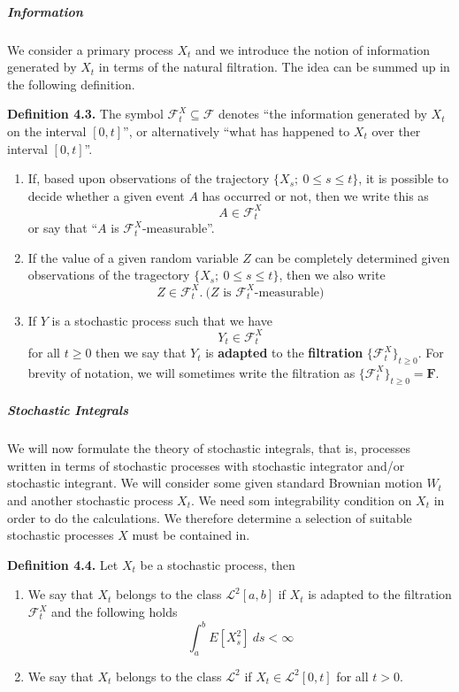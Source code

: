 \documentclass[
]{article}
\providecommand{\tightlist}{%
  \setlength{\itemsep}{0pt}\setlength{\parskip}{0pt}}
\begin{document}
\hypertarget{information}{%
\subparagraph{Information}\label{information}}

We consider a primary process \(X_t\) and we introduce the notion of
information generated by \(X_t\) in terms of the natural filtration. The
idea can be summed up in the following definition.

\textbf{Definition 4.3.} The symbol
\(\mathcal{F}^X_t\subseteq\mathcal{F}\) denotes ``the information
generated by \(X_t\) on the interval \([0,t]\)'', or alternatively
``what has happened to \(X_t\) over ther interval \([0,t]\)''.

\begin{enumerate}
\def\labelenumi{\arabic{enumi}.}
\tightlist
\item
  If, based upon observations of the trajectory
  \(\{X_s;\ 0\le s\le t\}\), it is possible to decide whether a given
  event \(A\) has occurred or not, then we write this as \[
    A\in\mathcal{F}^X_t
    \] or say that ``\(A\) is \(\mathcal{F}^X_t\)-measurable''.
\item
  If the value of a given random variable \(Z\) can be completely
  determined given observations of the tragectory
  \(\{X_s;\ 0\le s\le t\}\), then we also write \[
    Z\in\mathcal{F}^X_t.\ \text{(}Z\text{ is }\mathcal{F}^X_t\text{-measurable)}
    \]
\item
  If \(Y\) is a stochastic process such that we have \[
    Y_t\in\mathcal{F}^X_t
    \] for all \(t\ge0\) then we say that \(Y_t\) is \textbf{adapted} to
  the \textbf{filtration} \(\{\mathcal{F}^X_t\}_{t\ge 0}\). For brevity
  of notation, we will sometimes write the filtration as
  \(\{\mathcal{F}^X_t\}_{t\ge 0}=\mathbf{F}\).
\end{enumerate}

\hypertarget{stochastic-integrals-1}{%
\subparagraph{Stochastic Integrals}\label{stochastic-integrals-1}}

We will now formulate the theory of stochastic integrals, that is,
processes written in terms of stochastic processes with stochastic
integrator and/or stochastic integrant. We will consider some given
standard Brownian motion \(W_t\) and another stochastic process \(X_t\).
We need som integrability condition on \(X_t\) in order to do the
calculations. We therefore determine a selection of suitable stochastic
processes \(X\) must be contained in.

\textbf{Definition 4.4.} Let \(X_t\) be a stochastic process, then

\begin{enumerate}
\def\labelenumi{\roman{enumi}.}
\tightlist
\item
  We say that \(X_t\) belongs to the class \(\mathcal{L}^2[a,b]\) if
  \(X_t\) is adapted to the filtration \(\mathcal{F}^X_t\) and the
  following holds \[\int_a^bE[X_s^2]\ ds<\infty\]
\item
  We say that \(X_t\) belongs to the class \(\mathcal{L}^2\) if
  \(X_t\in\mathcal{L}^2[0,t]\) for all \(t>0\).
\end{enumerate}
\end{document}
